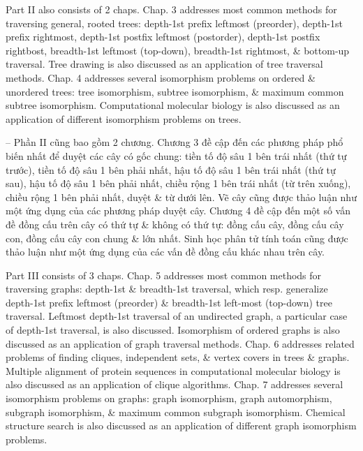 \documentclass{article}
\begin{document}
\begin{itemize}
	Part II also consists of 2 chaps. Chap. 3 addresses most common methods for traversing general, rooted trees: depth-1st prefix leftmost (preorder), depth-1st prefix rightmost, depth-1st postfix leftmost (postorder), depth-1st postfix rightbost, breadth-1st leftmost (top-down), breadth-1st rightmost, \& bottom-up traversal. Tree drawing is also discussed as an application of tree traversal methods. Chap. 4 addresses several isomorphism problems on ordered \& unordered trees: tree isomorphism, subtree isomorphism, \& maximum common subtree isomorphism. Computational molecular biology is also discussed as an application of different isomorphism problems on trees.
	
	-- Phần II cũng bao gồm 2 chương. Chương 3 đề cập đến các phương pháp phổ biến nhất để duyệt các cây có gốc chung: tiền tố độ sâu 1 bên trái nhất (thứ tự trước), tiền tố độ sâu 1 bên phải nhất, hậu tố độ sâu 1 bên trái nhất (thứ tự sau), hậu tố độ sâu 1 bên phải nhất, chiều rộng 1 bên trái nhất (từ trên xuống), chiều rộng 1 bên phải nhất, duyệt \& từ dưới lên. Vẽ cây cũng được thảo luận như một ứng dụng của các phương pháp duyệt cây. Chương 4 đề cập đến một số vấn đề đồng cấu trên cây có thứ tự \& không có thứ tự: đồng cấu cây, đồng cấu cây con, đồng cấu cây con chung \& lớn nhất. Sinh học phân tử tính toán cũng được thảo luận như một ứng dụng của các vấn đề đồng cấu khác nhau trên cây.
	
	Part III consists of 3 chaps. Chap. 5 addresses most common methods for traversing graphs: depth-1st \& breadth-1st traversal, which resp. generalize depth-1st prefix leftmost (preorder) \& breadth-1st left-most (top-down) tree traversal. Leftmost depth-1st traversal of an undirected graph, a particular case of depth-1st traversal, is also discussed. Isomorphism of ordered graphs is also discussed as an application of graph traversal methods. Chap. 6 addresses related problems of finding cliques, independent sets, \& vertex covers in trees \& graphs. Multiple alignment of protein sequences in computational molecular biology is also discussed as an application of clique algorithms. Chap. 7 addresses several isomorphism problems on graphs: graph isomorphism, graph automorphism, subgraph isomorphism, \& maximum common subgraph isomorphism. Chemical structure search is also discussed as an application of different graph isomorphism problems.
	

\end{itemize}
\end{document}
